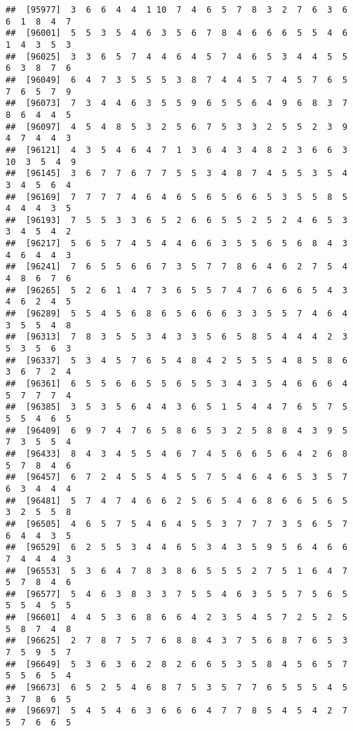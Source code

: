 \documentclass[
]{book}
\begin{document}
\begin{verbatim}
##  [95977]  3  6  6  4  4  1 10  7  4  6  5  7  8  3  2  7  6  3  6  6  1  8  4  7
##  [96001]  5  5  3  5  4  6  3  5  6  7  8  4  6  6  6  5  5  4  6  1  4  3  5  3
##  [96025]  3  3  6  5  7  4  4  6  4  5  7  4  6  5  3  4  4  5  5  6  3  8  7  6
##  [96049]  6  4  7  3  5  5  5  3  8  7  4  4  5  7  4  5  7  6  5  7  6  5  7  9
##  [96073]  7  3  4  4  6  3  5  5  9  6  5  5  6  4  9  6  8  3  7  8  6  4  4  5
##  [96097]  4  5  4  8  5  3  2  5  6  7  5  3  3  2  5  5  2  3  9  4  7  4  4  3
##  [96121]  4  3  5  4  6  4  7  1  3  6  4  3  4  8  2  3  6  6  3 10  3  5  4  9
##  [96145]  3  6  7  7  6  7  7  5  5  3  4  8  7  4  5  5  3  5  4  3  4  5  6  4
##  [96169]  7  7  7  7  4  6  4  6  5  6  5  6  6  5  3  5  5  8  5  4  4  4  3  5
##  [96193]  7  5  5  3  3  6  5  2  6  6  5  5  2  5  2  4  6  5  3  3  4  5  4  2
##  [96217]  5  6  5  7  4  5  4  4  6  6  3  5  5  6  5  6  8  4  3  4  6  4  4  3
##  [96241]  7  6  5  5  6  6  7  3  5  7  7  8  6  4  6  2  7  5  4  4  8  6  7  6
##  [96265]  5  2  6  1  4  7  3  6  5  5  7  4  7  6  6  6  5  4  3  4  6  2  4  5
##  [96289]  5  5  4  5  6  8  6  5  6  6  6  3  3  5  5  7  4  6  4  3  5  5  4  8
##  [96313]  7  8  3  5  5  3  4  3  3  5  6  5  8  5  4  4  4  2  3  5  3  5  6  3
##  [96337]  5  3  4  5  7  6  5  4  8  4  2  5  5  5  4  8  5  8  6  3  6  7  2  4
##  [96361]  6  5  5  6  6  5  5  6  5  5  3  4  3  5  4  6  6  6  4  5  7  7  7  4
##  [96385]  3  5  3  5  6  4  4  3  6  5  1  5  4  4  7  6  5  7  5  5  5  4  6  5
##  [96409]  6  9  7  4  7  6  5  8  6  5  3  2  5  8  8  4  3  9  5  7  3  5  5  4
##  [96433]  8  4  3  4  5  5  4  6  7  4  5  6  6  5  6  4  2  6  8  5  7  8  4  6
##  [96457]  6  7  2  4  5  5  4  5  5  7  5  4  6  4  6  5  3  5  7  6  3  4  4  4
##  [96481]  5  7  4  7  4  6  6  2  5  6  5  4  6  8  6  6  5  6  5  3  2  5  5  8
##  [96505]  4  6  5  7  5  4  6  4  5  5  3  7  7  7  3  5  6  5  7  6  4  4  3  5
##  [96529]  6  2  5  5  3  4  4  6  5  3  4  3  5  9  5  6  4  6  6  7  4  4  4  3
##  [96553]  5  3  6  4  7  8  3  8  6  5  5  5  2  7  5  1  6  4  7  5  7  8  4  6
##  [96577]  5  4  6  3  8  3  3  7  5  5  4  6  3  5  5  7  5  6  5  5  5  4  5  5
##  [96601]  4  4  5  3  6  8  6  6  4  2  3  5  4  5  7  2  5  2  5  5  8  7  4  8
##  [96625]  2  7  8  7  5  7  6  8  8  4  3  7  5  6  8  7  6  5  3  7  5  9  5  7
##  [96649]  5  3  6  3  6  2  8  2  6  6  5  3  5  8  4  5  6  5  7  5  5  6  5  4
##  [96673]  6  5  2  5  4  6  8  7  5  3  5  7  7  6  5  5  5  4  5  3  7  8  6  5
##  [96697]  5  4  5  4  6  3  6  6  6  4  7  7  8  5  4  5  4  2  7  5  7  6  6  5

\end{verbatim}
\end{document}
